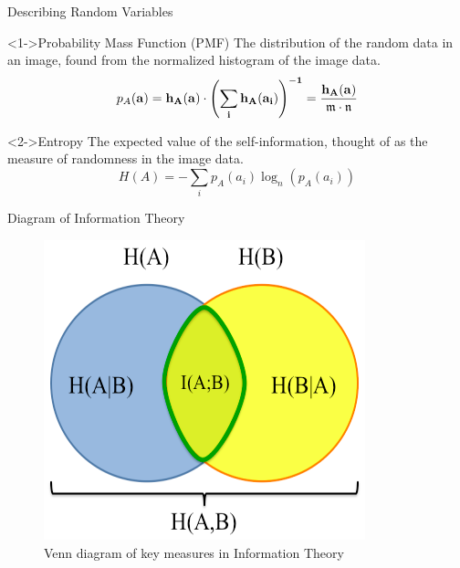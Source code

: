 \documentclass[serif]{beamer}
\begin{document}
\begin{frame}[c]{\sc Describing Random Variables}


\begin{block}<1->{Probability Mass Function (PMF)}
The distribution of the random data in an image, found from the normalized histogram of the image data.
\begin{equation}
\label{PMF}
	p_{A}(\bf{a})=h_{A}(\bf{a}) \cdot \left(\sum_{i}{h_{A}(a_{i})} \right)^{-1} = \frac{h_{A}(\bf{a})}{\mathfrak{m}\cdot\mathfrak{n}}
\end{equation}
\end{block}

\vfill

\begin{block}<2->{Entropy}
The expected value of the self-information, thought of as the measure of randomness in the image data.
\begin{equation}
\label{entropy}
	H(A) = - \sum_{i}{p_{A}(a_{i}) \log_{n}{\left(p_{A}(a_{i})\right)}}
\end{equation}
\end{block}

\end{frame}



\begin{frame}[c]{\sc Diagram of Information Theory}

\begin{figure}
\centering
\includegraphics[height=.7\textheight]{InformationTheory}
\caption{Venn diagram of key measures in Information Theory}
\label{infoTheory3}
\end{figure}

\end{frame}
\end{document}
